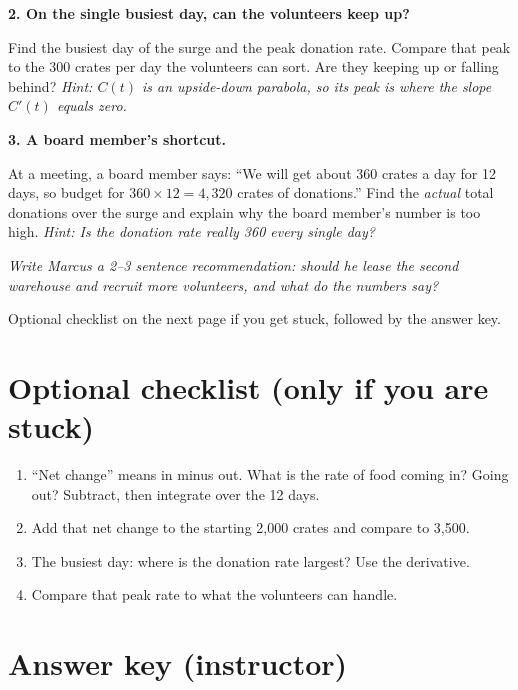 \documentclass[11pt]{article}
\newcommand{\question}[1]{\medskip\noindent\textbf{\color{ink}#1}\par\smallskip}
\newcommand{\hint}[1]{{\small\color{gray}\textit{Hint: #1}}\par}
\begin{document}
\question{2. On the single busiest day, can the volunteers keep up?}
Find the busiest day of the surge and the peak donation rate. Compare that peak to the 300 crates per day the volunteers can sort. Are they keeping up or falling behind?
\hint{$C(t)$ is an upside-down parabola, so its peak is where the slope $C'(t)$ equals zero.}

\question{3. A board member's shortcut.}
At a meeting, a board member says: ``We will get about 360 crates a day for 12 days, so budget for $360 \times 12 = 4{,}320$ crates of donations.'' Find the \emph{actual} total donations over the surge and explain why the board member's number is too high.
\hint{Is the donation rate really 360 every single day?}

\medskip
\noindent\textit{Write Marcus a 2--3 sentence recommendation: should he lease the second warehouse and recruit more volunteers, and what do the numbers say?}

\vfill

\begin{center}\small\color{gray}Optional checklist on the next page if you get stuck, followed by the answer key.\end{center}

\newpage

\section*{Optional checklist \small\color{gray}(only if you are stuck)}
\begin{enumerate}[leftmargin=*, itemsep=3pt]
\item ``Net change'' means in minus out. What is the rate of food coming in? Going out? Subtract, then integrate over the 12 days.
\item Add that net change to the starting 2{,}000 crates and compare to 3{,}500.
\item The busiest day: where is the donation rate largest? Use the derivative.
\item Compare that peak rate to what the volunteers can handle.
\end{enumerate}

\vspace{10pt}

\section*{Answer key \small\color{gray}(instructor)}
\end{document}
